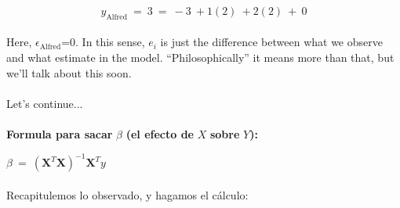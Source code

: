 \documentclass[10pt]{article}
\begin{document}
\begin{equation*}
y_{\text{Alfred}} \ =\ 3\ =\ -3\ +1( 2) \ +2( 2) \ +\ 0
\end{equation*}


\paragraph{}Here, $\displaystyle \epsilon _{\text{Alfred}}$=0. In this sense, $\displaystyle e_{i}$ is just the difference between what we observe and what estimate in the model. ``Philosophically'' it means more than that, but we'll talk about this soon.



\paragraph{}Let's continue...





\paragraph{}{\Large \textbf{Formula para sacar }$\displaystyle \beta $\textbf{ (el efecto de }$\displaystyle X$\textbf{ sobre }$\displaystyle Y$\textbf{):}}



$\displaystyle \beta \ =\ \left( \boldsymbol{X}^{T} \boldsymbol{X}\right)^{-1} \boldsymbol{X}^{T} y$



\paragraph{}Recapitulemos lo observado, y hagamos el c\'alculo:
\end{document}
